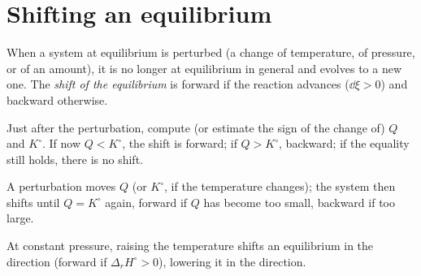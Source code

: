\section{Shifting an equilibrium}

\begin{definition}\label{def:b2:equilibrium-shifts:shift}
When a system at equilibrium is perturbed (a change of temperature, of
pressure, or of an amount), it is no longer at equilibrium in general and
evolves to a new one. The \emph{shift of the equilibrium}
is forward if the reaction advances ($\dd\xi > 0$) and backward
otherwise.
\end{definition}

\begin{method}\label{met:b2:equilibrium-shifts:predict-shift}
Just after the perturbation, compute (or estimate the sign of the change of)
$Q$ and $K^\circ$. If now $Q < K^\circ$, the shift is forward; if $Q > K^\circ$,
backward; if the equality still holds, there is no shift.
\end{method}

\begin{omfigure}

{\small A perturbation moves $Q$ (or $K^\circ$, if the temperature changes);
the system then shifts until $Q = K^\circ$ again, forward if $Q$ has become
too small, backward if too large.}
\end{omfigure}

\begin{proposition}[Temperature]\label{prop:b2:equilibrium-shifts:temperature}
At constant pressure, raising the temperature shifts an equilibrium in the
 direction (forward if $\Delta_r H^\circ > 0$), lowering it in the
 direction.
\end{proposition}

